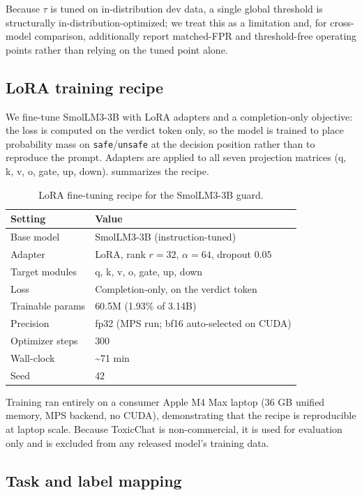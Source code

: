 \documentclass[sigconf,nonacm]{acmart}
\begin{document}
Because $\tau$ is tuned on in-distribution dev data, a single global threshold is structurally in-distribution-optimized; we treat this as a limitation and, for cross-model comparison, additionally report matched-FPR and threshold-free operating points rather than relying on the tuned point alone.

\subsection{LoRA training recipe}

We fine-tune SmolLM3-3B \cite{bakouch2025smollm3} with LoRA adapters \cite{hu2021lora} and a completion-only objective: the loss is computed on the verdict token only, so the model is trained to place probability mass on \texttt{safe}/\texttt{unsafe} at the decision position rather than to reproduce the prompt. Adapters are applied to all seven projection matrices (q, k, v, o, gate, up, down).  summarizes the recipe.

\begin{table}[t]
\small
\centering
\caption{LoRA fine-tuning recipe for the SmolLM3-3B guard.}
\label{tab:lora}
\begin{tabular}{ll}
\toprule
Setting & Value \\
\midrule
Base model & SmolLM3-3B (instruction-tuned) \\
Adapter & LoRA, rank $r=32$, $\alpha=64$, dropout $0.05$ \\
Target modules & q, k, v, o, gate, up, down \\
Loss & Completion-only, on the verdict token \\
Trainable params & 60.5M (1.93\% of 3.14B) \\
Precision & fp32 (MPS run; bf16 auto-selected on CUDA) \\
Optimizer steps & 300 \\
Wall-clock & \textasciitilde{}71 min \\
Seed & 42 \\
\bottomrule
\end{tabular}
\end{table}

Training ran entirely on a consumer Apple M4 Max laptop (36 GB unified memory, MPS backend, no CUDA), demonstrating that the recipe is reproducible at laptop scale. Because ToxicChat is non-commercial, it is used for evaluation only and is excluded from any released model's training data.

\subsection{Task and label mapping}
\label{sec:setup}
\end{document}
